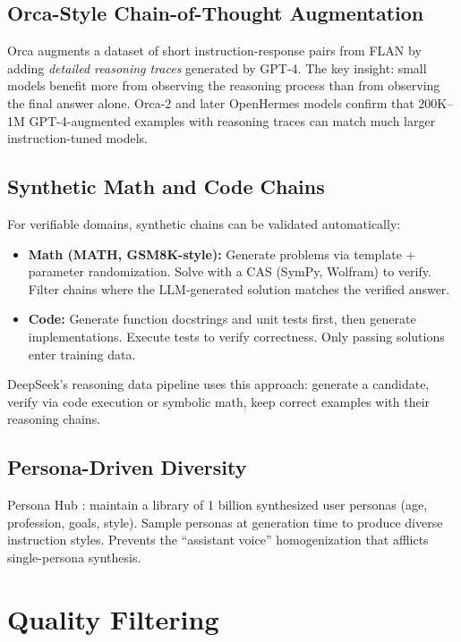 \subsection{Orca-Style Chain-of-Thought Augmentation}

Orca \parencite{mukherjee2023orca} augments a dataset of short instruction-response pairs from FLAN by adding \emph{detailed reasoning traces} generated by GPT-4. The key insight: small models benefit more from observing the reasoning process than from observing the final answer alone. Orca-2 and later OpenHermes models confirm that 200K--1M GPT-4-augmented examples with reasoning traces can match much larger instruction-tuned models.

\subsection{Synthetic Math and Code Chains}

For verifiable domains, synthetic chains can be validated automatically:
\begin{itemize}
  \item \textbf{Math (MATH, GSM8K-style):} Generate problems via template + parameter randomization. Solve with a CAS (SymPy, Wolfram) to verify. Filter chains where the LLM-generated solution matches the verified answer.
  \item \textbf{Code:} Generate function docstrings and unit tests first, then generate implementations. Execute tests to verify correctness. Only passing solutions enter training data.
\end{itemize}
DeepSeek's reasoning data pipeline uses this approach: generate a candidate, verify via code execution or symbolic math, keep correct examples with their reasoning chains.

\subsection{Persona-Driven Diversity}

Persona Hub \parencite{chan2024personahub}: maintain a library of 1 billion synthesized user personas (age, profession, goals, style). Sample personas at generation time to produce diverse instruction styles. Prevents the ``assistant voice'' homogenization that afflicts single-persona synthesis.

\section{Quality Filtering}

